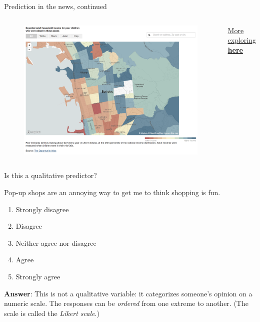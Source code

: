 \documentclass[aspectratio=169]{beamer}
\begin{document}
\begin{frame}{Prediction in the news, continued}

\begin{columns}
\begin{figure}
\includegraphics[height=0.8\textheight]{opportunityatlas}
\caption*{}
\end{figure}
\href{https://www.nytimes.com/2018/10/01/upshot/maps-neighborhoods-shape-child-poverty.html}{More exploring \textbf{here}}
\end{columns}
\end{frame}

\begin{frame}{Is this a qualitative predictor?}

Pop-up shops are an annoying way to get me to think shopping is fun.
\begin{enumerate}
\item Strongly disagree
\item Disagree
\item Neither agree nor disagree
\item Agree
\item Strongly agree
\end{enumerate}

\vspace{5mm}

\textbf{Answer}: \pause  This is not a qualitative variable: it categorizes someone's opinion on a numeric scale.  The responses can be \textit{ordered} from one extreme to another.  (The scale is called the \textit{Likert scale}.)

\end{frame}
\end{document}
